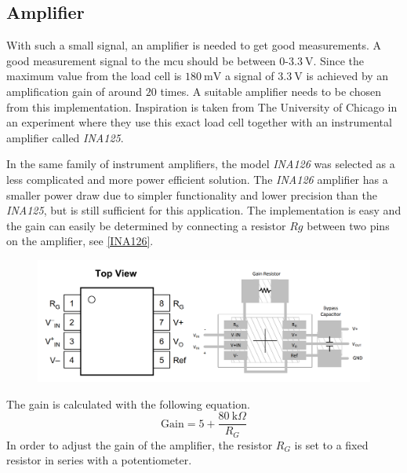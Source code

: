 \subsection{Amplifier}
With such a small signal, an amplifier is needed to get good measurements. A good measurement signal to the \gls{mcu} should be between $0$-$3.3~\textrm{V}$. Since the maximum value from the load cell is $180~\textrm{mV}$ a signal of $3.3~\textrm{V}$ is achieved by an amplification gain of around $20$ times.  
A suitable amplifier needs to be chosen from this implementation. Inspiration is taken from The University of Chicago\cite{UoC} in an experiment where they use this exact load cell together with an instrumental amplifier called \emph{INA125}. %

In the same family of instrument amplifiers, the model \emph{INA126} was selected as a less complicated and more power efficient solution.  
The \emph{INA126} amplifier has a smaller power draw due to simpler functionality and lower precision than the \emph{INA125}, but is still sufficient for this application.  
The implementation is easy and the gain can easily be determined by connecting a resistor $Rg$ between two pins on the amplifier, see \autoref{INA126}.

\begin{figure}[H]
\begin{center}
	\includegraphics[width = .8\textwidth]{Figures/INA126_pinout.png}
	\label{INA126}
\end{center}
\end{figure}

\noindent The gain is calculated with the following equation.  
\begin{equation}
\textrm{Gain} = 5 + \frac{80~\textrm{k}\Omega}{R_G}
\end{equation}
In order to adjust the gain of the amplifier, the resistor $R_G$ is set to a fixed resistor in series with a potentiometer.


